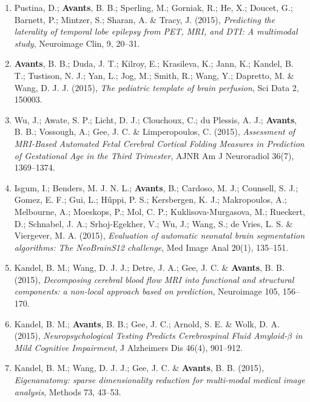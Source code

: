 \documentclass[11pt]{moderncv} %
\begin{document}
\begin{enumerate}
\item Pustina, D.; \textbf{Avants}, B. B.; Sperling, M.; Gorniak, R.; He, X.; Doucet, G.; Barnett, P.; Mintzer, S.; Sharan, A. \& Tracy, J. (2015), \textit{Predicting the laterality of temporal lobe epilepsy from PET, MRI, and DTI: A multimodal study}, Neuroimage Clin, 9, 20--31.

\item \textbf{Avants}, B. B.; Duda, J. T.; Kilroy, E.; Krasileva, K.; Jann, K.; Kandel, B. T.; Tustison, N. J.; Yan, L.; Jog, M.; Smith, R.; Wang, Y.; Dapretto, M. \& Wang, D. J. J. (2015), \textit{The pediatric template of brain perfusion}, Sci Data 2, 150003.

\item Wu, J.; Awate, S. P.; Licht, D. J.; Clouchoux, C.; du Plessis, A. J.; \textbf{Avants}, B. B.; Vossough, A.; Gee, J. C. \& Limperopoulos, C. (2015), \textit{Assessment of MRI-Based Automated Fetal Cerebral Cortical Folding Measures in Prediction of Gestational Age in the Third Trimester}, AJNR Am J Neuroradiol 36(7), 1369--1374.

\item Isgum, I.; Benders, M. J. N. L.; \textbf{Avants}, B.; Cardoso, M. J.; Counsell, S. J.; Gomez, E. F.; Gui, L.; Hűppi, P. S.; Kersbergen, K. J.; Makropoulos, A.; Melbourne, A.; Moeskops, P.; Mol, C. P.; Kuklisova-Murgasova, M.; Rueckert, D.; Schnabel, J. A.; Srhoj-Egekher, V.; Wu, J.; Wang, S.; de Vries, L. S. \& Viergever, M. A. (2015), \textit{Evaluation of automatic neonatal brain segmentation algorithms: The NeoBrainS12 challenge}, Med Image Anal 20(1), 135--151.

\item Kandel, B. M.; Wang, D. J. J.; Detre, J. A.; Gee, J. C. \& \textbf{Avants}, B. B. (2015), \textit{Decomposing cerebral blood flow MRI into functional and structural components: a non-local approach based on prediction}, Neuroimage 105, 156--170.

\item Kandel, B. M.; \textbf{Avants}, B. B.; Gee, J. C.; Arnold, S. E. \& Wolk, D. A. (2015), \textit{Neuropsychological Testing Predicts Cerebrospinal Fluid Amyloid-$\beta$ in Mild Cognitive Impairment}, J Alzheimers Dis 46(4), 901--912.

\item Kandel, B. M.; Wang, D. J. J.; Gee, J. C. \& \textbf{Avants}, B. B. (2015), \textit{Eigenanatomy: sparse dimensionality reduction for multi-modal medical image analysis}, Methods 73, 43--53.


\end{enumerate}
\end{document}
